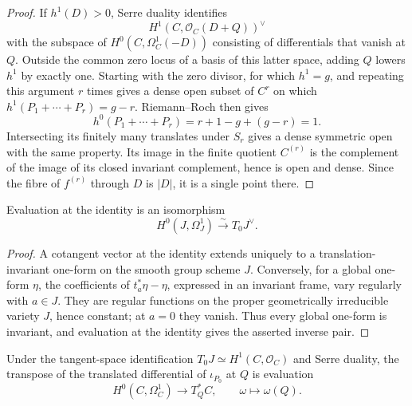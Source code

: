 \begin{proof}
  If \(h^1(D)>0\), Serre duality identifies
  \[
    H^1(C,\mathcal O_C(D+Q))^\vee
  \]
  with the subspace of \(H^0(C,\Omega_C^1(-D))\) consisting of
  differentials that vanish at \(Q\).  Outside the common zero locus of a
  basis of this latter space,
  adding \(Q\) lowers \(h^1\) by exactly one.  Starting with the zero
  divisor, for which \(h^1=g\), and repeating this argument \(r\) times
  gives a dense open subset of \(C^r\) on which
  \(h^1(P_1+\cdots+P_r)=g-r\).  Riemann--Roch then gives
  \[
    h^0(P_1+\cdots+P_r)
      =r+1-g+(g-r)=1.
  \]
  Intersecting its finitely many translates under \(S_r\) gives a dense
  symmetric open with the same property.  Its image in the finite quotient
  \(C^{(r)}\) is the complement of the image of its closed invariant
  complement, hence is open and dense.
  Since the fibre of \(f^{(r)}\) through \(D\) is \(|D|\), it is a single
  point there.
\end{proof}

\begin{lemma}
  \label{mk-lem:jacobian_invariant_one_forms}

  Evaluation at the identity is an isomorphism
  \[
    H^0(J,\Omega_J^1)\xrightarrow{\sim}T_0J^\vee.
  \]
\end{lemma}

\begin{proof}
  A cotangent vector at the identity extends uniquely to a
  translation-invariant one-form on the smooth group scheme \(J\).
  Conversely, for a global one-form \(\eta\), the coefficients of
  \(t_a^*\eta-\eta\), expressed in an invariant frame, vary regularly with
  \(a\in J\).  They are regular functions on the proper geometrically
  irreducible variety \(J\), hence constant; at \(a=0\) they vanish.  Thus
  every global one-form is invariant, and evaluation at the identity gives
  the asserted inverse pair.
\end{proof}

\begin{lemma}
  \label{mk-lem:abel_jacobi_differential}

  Under the tangent-space identification
  \(T_0J\simeq H^1(C,\mathcal O_C)\) and Serre duality, the transpose of the
  translated differential of \(\iota_{P_0}\) at \(Q\) is evaluation
  \[
    H^0(C,\Omega_C^1)\longrightarrow T_Q^*C,
    \qquad \omega\longmapsto\omega(Q).
  \]
\end{lemma}

